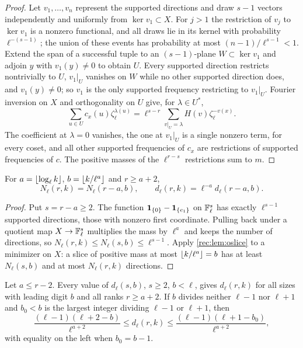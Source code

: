 \begin{proof}
Let $v_1,\dots,v_n$ represent the supported directions and draw $s-1$ vectors independently and uniformly from
$\ker v_1\subset X$. For $j>1$ the restriction of $v_j$ to $\ker v_1$ is a nonzero functional, and all draws lie in its
kernel with probability $\ell^{-(s-1)}$; the union of these events has probability at most $(n-1)/\ell^{s-1}<1$. Extend
the span of a successful tuple to an $(s-1)$-plane $W\subset\ker v_1$ and adjoin $y$ with $v_1(y)\ne0$ to obtain $U$. Every
supported direction restricts nontrivially to $U$, $v_1|_U$ vanishes on $W$ while no other supported direction
does, and $v_1(y)\ne0$; so $v_1$ is the only supported frequency restricting to $v_1|_U$. Fourier inversion on $X$ and
orthogonality on $U$ give, for $\lambda\in U^*$,
\[
 \sum_{u\in U}c_x(u)\zeta_\ell^{\lambda(u)}=\ell^{s-r}\sum_{v|_U=\lambda}H(v)\zeta_\ell^{-v(x)}.
\]
The coefficient at $\lambda=0$ vanishes, the one at $v_1|_U$ is a single nonzero term, for every coset, and all other
supported frequencies of $c_x$ are restrictions of supported frequencies of $c$. The positive masses of the
$\ell^{r-s}$ restrictions sum to $m$.
\end{proof}

\begin{theorem}\label{rec:thm:odescent}
For $a=\lfloor\log_\ell k\rfloor$, $b=\lfloor k/\ell^a\rfloor$ and $r\ge a+2$,
\[
 N_\ell(r,k)=N_\ell(r-a,b),\qquad d_\ell(r,k)=\ell^{-a}d_\ell(r-a,b).
\]
\end{theorem}

\begin{proof}
Put $s=r-a\ge2$. The function $\mathbf 1_{\{0\}}-\mathbf 1_{\{e_1\}}$ on $\mathbb{F}_\ell^s$ has exactly $\ell^{s-1}$ supported directions, those with
nonzero first coordinate. Pulling back under a quotient map $X\to\mathbb{F}_\ell^s$ multiplies the mass by $\ell^a$ and keeps the
number of directions, so $N_\ell(r,k)\le N_\ell(s,b)\le\ell^{s-1}$. Apply \cref{rec:lem:oslice} to a minimizer on $X$: a slice of
positive mass at most $\lfloor k/\ell^a\rfloor=b$ has at least $N_\ell(s,b)$ and at most $N_\ell(r,k)$ directions.
\end{proof}

\begin{corollary}\label{rec:cor:ogap}
Let $a\le r-2$. Every value of $d_\ell(s,b)$, $s\ge2$, $b<\ell$, gives $d_\ell(r,k)$ for all sizes with leading digit $b$ and all
ranks $r\ge a+2$. If $b$ divides neither $\ell-1$ nor $\ell+1$ and $b_0<b$ is the largest integer dividing $\ell-1$ or $\ell+1$, then
\[
 \frac{(\ell-1)(\ell+2-b)}{\ell^{a+2}}\le d_\ell(r,k)\le\frac{(\ell-1)(\ell+1-b_0)}{\ell^{a+2}},
\]
with equality on the left when $b_0=b-1$.
\end{corollary}

